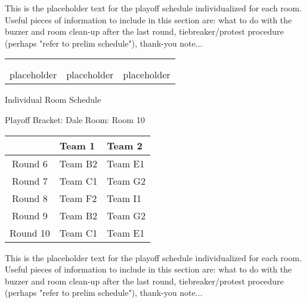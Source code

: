 \documentclass{article}%
\begin{document}
\vspace*{16pt}%
\linebreak%
This is the placeholder text for the playoff schedule individualized for each room. Useful pieces of information to include in this section are: what to do with the buzzer and room clean{-}up after the last round, tiebreaker/protest procedure (perhaps "refer to prelim schedule"), thank{-}you note...%
\vspace*{30pt}%
\newline%
%
\begin{tabularx}{\textwidth}{YYY}%
  &  &  \\%
\\%
placeholder&placeholder&placeholder\\%
\end{tabularx}%
\newpage%
\begin{center}%
\begin{Huge}%
Individual Room Schedule%
\end{Huge}%
\vspace*{16pt}%
\linebreak%
\begin{Large}%
Playoff Bracket: Dale \hfill Room: Room 10%
\end{Large}%
\end{center}%
%
\begin{tabularx}{\textwidth}{|c|Y|Y|}%
\hline%
&Team 1&Team 2\\%
\hline%
Round 6&Team B2&Team E1\\%
Round 7&Team C1&Team G2\\%
Round 8&Team F2&Team I1\\%
Round 9&Team B2&Team G2\\%
Round 10&Team C1&Team E1\\%
\hline%
\end{tabularx}%
\vspace*{16pt}%
\linebreak%
This is the placeholder text for the playoff schedule individualized for each room. Useful pieces of information to include in this section are: what to do with the buzzer and room clean{-}up after the last round, tiebreaker/protest procedure (perhaps "refer to prelim schedule"), thank{-}you note...%
\vspace*{30pt}%
\newline%
\end{document}

